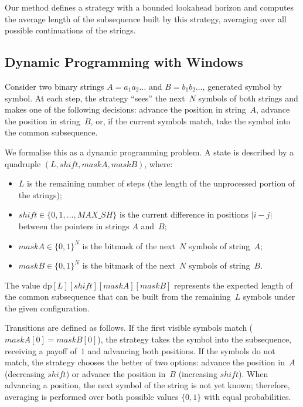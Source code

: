 \documentclass[12pt,a4paper]{article}
\begin{document}
Our method defines a strategy with a bounded lookahead horizon and computes the average length of the subsequence built by this strategy, averaging over all possible continuations of the strings.

\subsection{Dynamic Programming with Windows}
Consider two binary strings $A = a_1 a_2 \ldots$ and $B = b_1 b_2 \ldots$\!, generated symbol by symbol.
At each step, the strategy ``sees'' the next~$N$ symbols of both strings and makes one of the following decisions: advance the position in string~$A$, advance the position in string~$B$, or, if the current symbols match, take the symbol into the common subsequence.

We formalise this as a dynamic programming problem.
A state is described by a quadruple $(L, \mathit{shift}, \mathit{maskA}, \mathit{maskB})$, where:
\begin{itemize}
  \item $L$ is the remaining number of steps (the length of the unprocessed portion of the strings);
  \item $\mathit{shift} \in \{0, 1, \ldots, \mathit{MAX\_SH}\}$ is the current difference in positions $|i - j|$ between the pointers in strings $A$ and~$B$;
  \item $\mathit{maskA} \in \{0,1\}^N$ is the bitmask of the next~$N$ symbols of string~$A$;
  \item $\mathit{maskB} \in \{0,1\}^N$ is the bitmask of the next~$N$ symbols of string~$B$.
\end{itemize}
The value $\mathrm{dp}[L][\mathit{shift}][\mathit{maskA}][\mathit{maskB}]$ represents the expected length of the common subsequence that can be built from the remaining~$L$ symbols under the given configuration.

Transitions are defined as follows.
If the first visible symbols match ($\mathit{maskA}[0] = \mathit{maskB}[0]$), the strategy takes the symbol into the subsequence, receiving a payoff of~$1$ and advancing both positions.
If the symbols do not match, the strategy chooses the better of two options: advance the position in~$A$ (decreasing $\mathit{shift}$) or advance the position in~$B$ (increasing $\mathit{shift}$).
When advancing a position, the next symbol of the string is not yet known; therefore, averaging is performed over both possible values $\{0, 1\}$ with equal probabilities.
\end{document}
